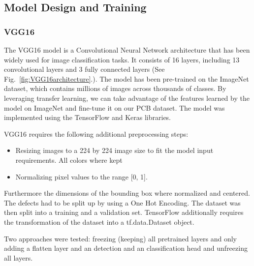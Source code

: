 \documentclass[12pt]{article}
\begin{document}
\subsection{Model Design and Training}

\subsubsection{VGG16}

The VGG16 model is a Convolutional Neural Network architecture that has been widely used for image classification tasks. It consists of 16 layers, including 13 convolutional layers and 3 fully connected layers (See Fig.~\ref{fig:VGG16architecture}.). The model has been pre-trained on the ImageNet\cite{ConxVGG16ImageNet} dataset, which contains millions of images across thousands of classes. By leveraging transfer learning, we can take advantage of the features learned by the model on ImageNet and fine-tune it on our PCB dataset.
The model was implemented using the TensorFlow and Keras\cite{KerasAPI} libraries.  

VGG16 requires the following additional preprocessing steps: 

\begin{itemize}
    \item Resizing images to a 224 by 224 image size to fit the model input requirements. All colors where kept
    \item Normalizing pixel values to the range [0, 1].  
\end{itemize}

Furthermore the dimensions of the bounding box where normalized and centered. The defects had to be split up by using a One Hot Encoding. The dataset was then split into a training and a validation set. 
TensorFlow additionally requires the transformation of the dataset into a tf.data.Dataset object.

Two approaches were tested: freezing (keeping) all pretrained layers and only adding a flatten layer and an detection and an classification head and unfreezing all layers.
\end{document}
